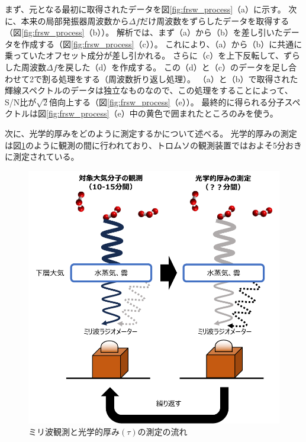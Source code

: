 まず、元となる最初に取得されたデータを図\ref{fig:frsw_process}（a）に示す。
次に、本来の局部発振器周波数から$\Delta f$だけ周波数をずらしたデータを取得する（図\ref{fig:frsw_process}（b））。
解析では、まず（a）から（b）を差し引いたデータを作成する（図\ref{fig:frsw_process}（c））。
これにより、（a）から（b）に共通に乗っていたオフセット成分が差し引かれる。
さらに（c）を上下反転して、ずらした周波数$\Delta f$を戻した（d）を作成する。
この（d）と（c）のデータを足し合わせて2で割る処理をする（周波数折り返し処理）。
（a）と（b）で取得された輝線スペクトルのデータは独立なものなので、この処理をすることによって、S/N比が$\sqrt{2}$倍向上する（図\ref{fig:frsw_process}（e））。
最終的に得られる分子スペクトルは図\ref{fig:frsw_process}（e）中の黄色で囲まれたところのみを使う。


次に、光学的厚みをどのように測定するかについて述べる。
光学的厚みの測定は図\ref{fig:opticaldepth_measurement}のように観測の間に行われており、トロムソの観測装置ではおよそ5分おきに測定されている。
\begin{figure}[htbp]
    \centering
    \includegraphics[width=\linewidth]{master_thesis_contents/master_thesis_fig/opticaldepth_measurement.pdf}
    \caption{ミリ波観測と光学的厚み$(\tau)$の測定の流れ}
    \label{fig:opticaldepth_measurement}
\end{figure}
